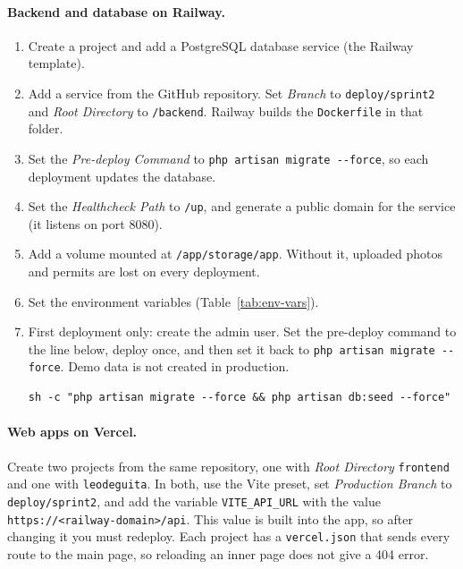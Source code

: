 \paragraph{Backend and database on Railway.}
\begin{enumerate}[nosep]
  \item Create a project and add a PostgreSQL database service (the Railway template).
  \item Add a service from the GitHub repository.
        Set \textit{Branch} to \texttt{deploy/sprint2} and \textit{Root Directory} to \texttt{/backend}.
        Railway builds the \texttt{Dockerfile} in that folder.
  \item Set the \textit{Pre-deploy Command} to \texttt{php artisan migrate -{}-force}, so each deployment updates the database.
  \item Set the \textit{Healthcheck Path} to \texttt{/up}, and generate a public domain for the service (it listens on port 8080).
  \item Add a volume mounted at \texttt{/app/storage/app}.
        Without it, uploaded photos and permits are lost on every deployment.
  \item Set the environment variables (Table~\ref{tab:env-vars}).
  \item First deployment only: create the admin user.
        Set the pre-deploy command to the line below, deploy once, and then set it back to \texttt{php artisan migrate -{}-force}.
        Demo data is not created in production.
\begin{lstlisting}[language={}]
sh -c "php artisan migrate --force && php artisan db:seed --force"
\end{lstlisting}
\end{enumerate}

\paragraph{Web apps on Vercel.}
Create two projects from the same repository, one with \textit{Root Directory} \texttt{frontend} and one with \texttt{leodeguita}.
In both, use the Vite preset, set \textit{Production Branch} to \texttt{deploy/sprint2}, and add the variable \texttt{VITE\_API\_URL} with the value \texttt{https://}\allowbreak\texttt{<railway-domain>/api}.
This value is built into the app, so after changing it you must redeploy.
Each project has a \texttt{vercel.json} that sends every route to the main page, so reloading an inner page does not give a 404 error.

